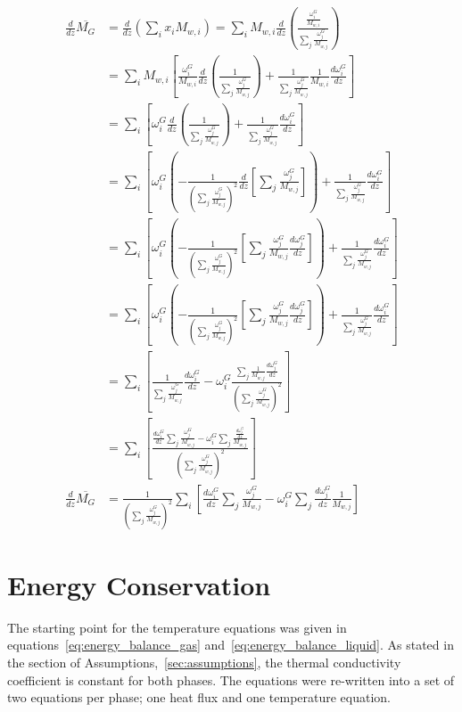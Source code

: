 \documentclass{article}
\begin{document}
\begin{equation}
	\begin{split}
	\frac{d}{dz} \overline{M_G} &=  \frac{d}{dz}\left(\sum_ix_iM_{w,i}\right) = \sum_i M_{w,i} \frac{d}{dz}\left( \frac{\frac{\omega_i^G}{M_{w,i}}}{\sum_j\frac{\omega_j^G}{M_{w,j}}}\right)\\
	&= \sum_i M_{w,i} \left[\frac{\omega_i^G}{M_{w,i}}\frac{d}{dz}\left(\frac{1}{\sum_j \frac{\omega_j^G}{M_{w,j}}} \right) + \frac{1}{\sum_j \frac{\omega_j^G}{M_{w,j}}}  \frac{1}{M_{w,i}}\frac{d \omega_i^G}{dz}\right] \\
	&= \sum_i \left[\omega_i^G\frac{d}{dz}\left(\frac{1}{\sum_j \frac{\omega_j^G}{M_{w,j}}} \right) + \frac{1}{\sum_j \frac{\omega_j^G}{M_{w,j}}}\frac{d \omega_i^G}{dz}\right] \\
	&= \sum_i \left[\omega_i^G\left(-\frac{1}{\left(\sum_j \frac{\omega_j^G}{M_{w,j}}\right)^2} \frac{d}{dz}\left[\sum_j \frac{\omega_j^G}{M_{w,j}} \right]  \right)  + \frac{1}{\sum_j \frac{\omega_j^G}{M_{w,j}}}\frac{d \omega_i^G}{dz}\right] \\
	&= \sum_i \left[\omega_i^G\left(-\frac{1}{\left(\sum_j \frac{\omega_j^G}{M_{w,j}}\right)^2} \left[ \sum_j \frac{\omega_j^G}{M_{w,j}}\frac{d \omega_j^G}{dz} \right]  \right)  + \frac{1}{\sum_j \frac{\omega_j^G}{M_{w,j}}}\frac{d \omega_i^G}{dz}\right] \\
	&= \sum_i \left[\omega_i^G\left(-\frac{1}{\left(\sum_j \frac{\omega_j^G}{M_{w,j}}\right)^2} \left[ \sum_j \frac{\omega_j^G}{M_{w,j}}\frac{d \omega_j^G}{dz} \right]  \right)  + \frac{1}{\sum_j \frac{\omega_j^G}{M_{w,j}}}\frac{d \omega_i^G}{dz}\right] \\
	&= \sum_i \left[\frac{1}{\sum_j \frac{\omega_j^G}{M_{w,j}}}\frac{d \omega_i^G}{dz} - \omega_i^G\frac{\sum_j \frac{1}{M_{w,j}}\frac{d \omega_j^G}{dz}}{\left(\sum_j \frac{\omega_j^G}{M_{w,j}}\right)^2}\right] \\
	&= \sum_i \left[\frac{\frac{d \omega_i^G}{dz}\sum_j \frac{\omega_j^G}{M_{w,j}} - \omega_i^G \sum_j \frac{\frac{d \omega_j^G}{dz}}{M_{w,j}}}{\left(\sum_j \frac{\omega_j^G}{M_{w,j}}\right)^2}\right] \\
	\frac{d}{dz} \overline{M_G} &= \frac{1}{\left(\sum_j \frac{\omega_j^G}{M_{w,j}}\right)^2}\sum_i \left[\frac{d \omega_i^G}{dz}\sum_j \frac{\omega_j^G}{M_{w,j}} - \omega_i^G \sum_j \frac{d \omega_j^G}{dz}\frac{1}{M_{w,j}}\right]
	\end{split}
\end{equation}

\section{Energy Conservation}
The starting point for the temperature equations was given in equations~\ref{eq:energy_balance_gas} and~\ref{eq:energy_balance_liquid}. As stated in the section of Assumptions,~\ref{sec:assumptions}, the thermal conductivity coefficient is constant for both phases. The equations were re-written into a set of two equations per phase; one heat flux and one temperature equation.
\end{document}

